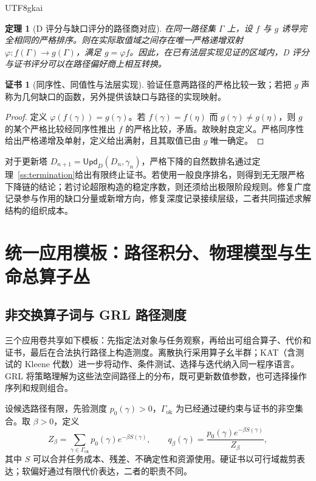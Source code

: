 \documentclass[11pt,a4paper]{article}
\theoremstyle{plain}
\newtheorem{theorem}{定理}[section]
\theoremstyle{definition}
\newtheorem*{certificate}{证书}
\theoremstyle{remark}
\begin{document}
\begin{CJK*}{UTF8}{gkai}
\begin{theorem}[D 评分与缺口评分的路径商对应]
\label{fa:thm-decision}
在同一路径集 $\Gamma$ 上，设 $f$ 与 $g$ 诱导完全相同的严格排序。则在实际取值域之间存在唯一严格递增双射 $\varphi:f(\Gamma)\to g(\Gamma)$，满足 $g=\varphi f$。因此，在已有法层实现见证的区域内，D 评分与证书评分可以在路径偏好商上相互转换。
\end{theorem}
\begin{certificate}[同序性、同值性与法层实现]
验证任意两路径的严格比较一致；若把 $g$ 声称为几何缺口的函数，另外提供该缺口与路径的实现映射。
\end{certificate}
\begin{proof}
定义 $\varphi(f(\gamma))=g(\gamma)$。若 $f(\gamma)=f(\eta)$ 而 $g(\gamma)\ne g(\eta)$，则 $g$ 的某个严格比较经同序性推出 $f$ 的严格比较，矛盾。故映射良定义。严格同序性给出严格递增及单射，定义给出满射，且其取值已由 $g$ 唯一确定。
\end{proof}

对于更新塔 $D_{n+1}=\mathsf{Upd}_D(D_n,\gamma_n)$，严格下降的自然数排名通过定理~\ref{ss:termination}给出有限终止证书。若使用一般良序排名，则得到无无限严格下降链的结论；若讨论超限构造的稳定序数，则还须给出极限阶段规则。修复广度记录参与作用的缺口分量或新增方向，修复深度记录接续层级，二者共同描述求解结构的组织成本。

\section{统一应用模板：路径积分、物理模型与生命总算子丛}
\label{fa:applications}

\subsection{非交换算子词与 GRL 路径测度}

三个应用卷共享如下模板：先指定法对象与任务观察，再给出可组合算子、代价和证书，最后在合法执行路径上构造测度。离散执行采用算子幺半群；KAT（含测试的 Kleene 代数）进一步将动作、条件测试、选择与迭代纳入同一程序语言。GRL 将策略理解为这些法空间路径上的分布，既可更新数值参数，也可选择操作序列和规则组合。\cite{S02,S03,S04}

设候选路径有限，先验测度 $p_0(\gamma)>0$，$\Gamma_{\mathrm{ok}}$ 为已经通过硬约束与证书的非空集合。取 $\beta>0$，定义
\[
 Z_\beta=\sum_{\gamma\in\Gamma_{\mathrm{ok}}}
 p_0(\gamma)e^{-\beta S(\gamma)},\qquad
 q_\beta(\gamma)=\frac{p_0(\gamma)e^{-\beta S(\gamma)}}{Z_\beta},
\]
其中 $S$ 可以合并任务成本、残差、不确定性和资源使用。硬证书以可行域裁剪表达；软偏好通过有限代价表达，二者的职责不同。


\end{CJK*}
\end{document}
